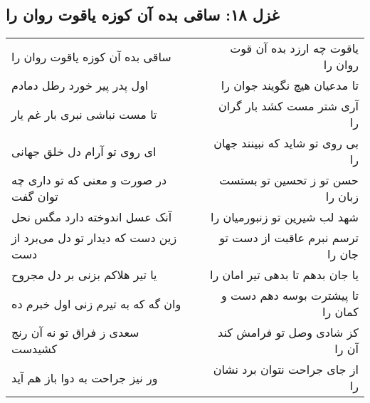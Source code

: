\begin{center}
\section*{غزل ۱۸: ساقی بده آن کوزه یاقوت روان را}
\label{sec:018}
\begin{longtable}{l p{0.5cm} r}
ساقی بده آن کوزه یاقوت روان را
&&
یاقوت چه ارزد بده آن قوت روان را
\\
اول پدر پیر خورد رطل دمادم
&&
تا مدعیان هیچ نگویند جوان را
\\
تا مست نباشی نبری بار غم یار
&&
آری شتر مست کشد بار گران را
\\
ای روی تو آرام دل خلق جهانی
&&
بی روی تو شاید که نبینند جهان را
\\
در صورت و معنی که تو داری چه توان گفت
&&
حسن تو ز تحسین تو بستست زبان را
\\
آنک عسل اندوخته دارد مگس نحل
&&
شهد لب شیرین تو زنبورمیان را
\\
زین دست که دیدار تو دل می‌برد از دست
&&
ترسم نبرم عاقبت از دست تو جان را
\\
یا تیر هلاکم بزنی بر دل مجروح
&&
یا جان بدهم تا بدهی تیر امان را
\\
وان گه که به تیرم زنی اول خبرم ده
&&
تا پیشترت بوسه دهم دست و کمان را
\\
سعدی ز فراق تو نه آن رنج کشیدست
&&
کز شادی وصل تو فرامش کند آن را
\\
ور نیز جراحت به دوا باز هم آید
&&
از جای جراحت نتوان برد نشان را
\\
\end{longtable}
\end{center}
